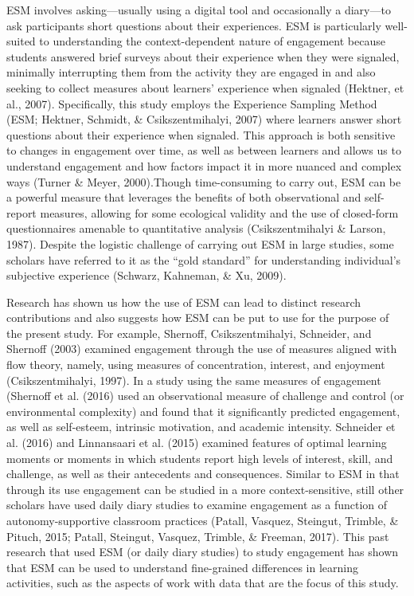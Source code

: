 \documentclass[]{book}
\theoremstyle{definition}
\theoremstyle{definition}
\theoremstyle{definition}
\theoremstyle{remark}
\begin{document}
ESM involves asking---usually using a digital tool and occasionally a
diary---to ask participants short questions about their experiences. ESM
is particularly well-suited to understanding the context-dependent
nature of engagement because students answered brief surveys about their
experience when they were signaled, minimally interrupting them from the
activity they are engaged in and also seeking to collect measures about
learners' experience when signaled (Hektner, et al., 2007).
Specifically, this study employs the Experience Sampling Method (ESM;
Hektner, Schmidt, \& Csikszentmihalyi, 2007) where learners answer short
questions about their experience when signaled. This approach is both
sensitive to changes in engagement over time, as well as between
learners and allows us to understand engagement and how factors impact
it in more nuanced and complex ways (Turner \& Meyer, 2000).Though
time-consuming to carry out, ESM can be a powerful measure that
leverages the benefits of both observational and self-report measures,
allowing for some ecological validity and the use of closed-form
questionnaires amenable to quantitative analysis (Csikszentmihalyi \&
Larson, 1987). Despite the logistic challenge of carrying out ESM in
large studies, some scholars have referred to it as the ``gold
standard'' for understanding individual's subjective experience
(Schwarz, Kahneman, \& Xu, 2009).

Research has shown us how the use of ESM can lead to distinct research
contributions and also suggests how ESM can be put to use for the
purpose of the present study. For example, Shernoff, Csikszentmihalyi,
Schneider, and Shernoff (2003) examined engagement through the use of
measures aligned with flow theory, namely, using measures of
concentration, interest, and enjoyment (Csikszentmihalyi, 1997). In a
study using the same measures of engagement (Shernoff et al. (2016) used
an observational measure of challenge and control (or environmental
complexity) and found that it significantly predicted engagement, as
well as self-esteem, intrinsic motivation, and academic intensity.
Schneider et al. (2016) and Linnansaari et al. (2015) examined features
of optimal learning moments or moments in which students report high
levels of interest, skill, and challenge, as well as their antecedents
and consequences. Similar to ESM in that through its use engagement can
be studied in a more context-sensitive, still other scholars have used
daily diary studies to examine engagement as a function of
autonomy-supportive classroom practices (Patall, Vasquez, Steingut,
Trimble, \& Pituch, 2015; Patall, Steingut, Vasquez, Trimble, \&
Freeman, 2017). This past research that used ESM (or daily diary
studies) to study engagement has shown that ESM can be used to
understand fine-grained differences in learning activities, such as the
aspects of work with data that are the focus of this study.
\end{document}
